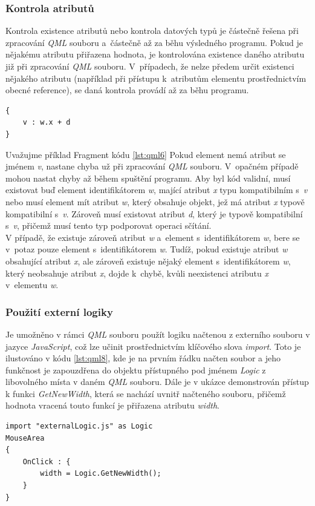 \documentclass[11pt,twoside,a4paper]{book}
\begin{document}
\subsubsection{Kontrola atributů}
Kontrola existence atributů nebo kontrola datových typů je částečně řešena při zpracování \textit{QML} souboru a~částečně až za běhu výsledného programu. Pokud je nějakému atributu přiřazena hodnota, je kontrolována existence daného atributu již při zpracování \textit{QML} souboru. V~případech, že nelze předem určit existenci nějakého atributu (například při přístupu k~atributům elementu prostřednictvím obecné reference), se daná kontrola provádí až za běhu programu.
\begin{lstlisting}[frame=single,caption=Ukázka přístupu k atributu pomocí reference na element.,label=lst:qml6]
{
	v : w.x + d
}
\end{lstlisting}
Uvažujme příklad Fragment kódu \ref{lst:qml6} Pokud element nemá atribut se jménem \textit{v}, nastane chyba už při zpracování \textit{QML} souboru. V~opačném případě mohou nastat chyby až během spuštění programu. Aby byl kód validní, musí existovat buď element identifikátorem \textit{w}, mající atribut \textit{x} typu kompatibilním s~\textit{v} nebo musí element mít atribut \textit{w}, který obsahuje objekt, jež má atribut \textit{x} typově kompatibilní s~\textit{v}. Zároveň musí existovat atribut \textit{d}, který je typově kompatibilní s~\textit{v}, přičemž musí tento typ podporovat operaci sčítání.\\
V případě, že existuje zároveň atribut \textit{w} a~element s~identifikátorem \textit{w}, bere se v~potaz pouze element s~identifikátorem \textit{w}. Tudíž, pokud existuje atribut \textit{w} obsahující atribut \textit{x}, ale zároveň existuje nějaký element s~identifikátorem \textit{w}, který neobsahuje atribut \textit{x}, dojde k~chybě, kvůli neexistenci atributu \textit{x} v~elementu \textit{w}. 

\subsubsection{Použití externí logiky}
Je umožněno v rámci \textit{QML} souboru použít logiku načtenou z externího souboru v jazyce \textit{JavaScript}, což lze učinit prostřednictvím klíčového slova \textit{import}.  Toto je ilustováno v kódu \ref{lst:qml8}, kde je na prvním řádku načten soubor  a jeho funkčnost je zapouzdřena do objektu přístupného pod jménem \textit{Logic} z libovolného místa v daném \textit{QML} souboru. Dále je v ukázce demonstrován přístup k funkci \textit{GetNewWidth}, která se nachází uvnitř načteného souboru, přičemž hodnota vracená touto funkcí je přiřazena atributu \textit{width}.
\begin{lstlisting}[frame=single,caption=Použití externí logiky v jazyce \textit{QML}.,label=lst:qml8]
import "externalLogic.js" as Logic
MouseArea
{
	OnClick : {
		width = Logic.GetNewWidth();
	}
}
\end{lstlisting}
\clearpage
\end{document}
